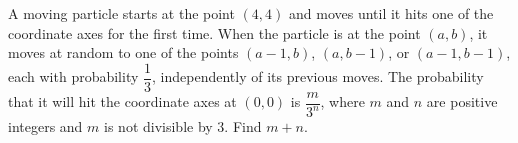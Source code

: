A moving particle starts at the point $(4,4)$ and moves until it hits one of the coordinate axes for the first time. When the particle is at the point $(a,b)$, it moves at random to one of the points $(a-1,b)$, $(a,b-1)$, or $(a-1,b-1)$, each with probability $\dfrac{1}{3}$, independently of its previous moves. The probability that it will hit the coordinate axes at $(0,0)$ is $\dfrac{m}{3^n}$, where $m$ and $n$ are positive integers and $m$ is not divisible by $3$. Find $m+n$.
